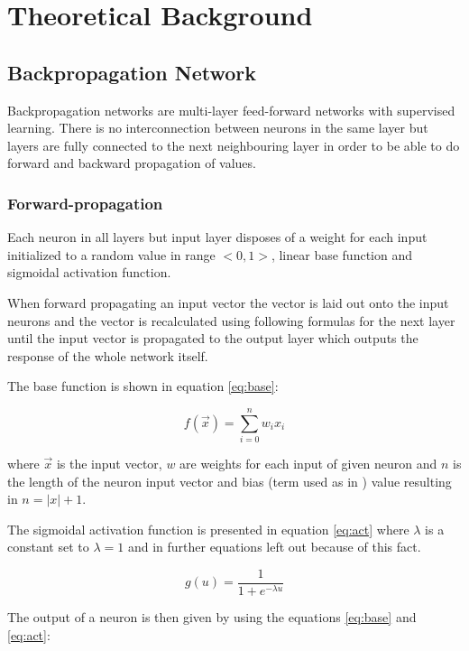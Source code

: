 \section{Theoretical Background}
\label{sec:theory}

\subsection{Backpropagation Network}
Backpropagation networks are multi-layer feed-forward networks with supervised learning. There is no interconnection between neurons in the same layer but layers are fully connected to the next neighbouring layer in order to be able to do forward and backward propagation of values.

\subsubsection{Forward-propagation}
Each neuron in all layers but input layer disposes of a weight for each input initialized to a random value in range $<0,1>$, linear base function and sigmoidal activation function.

When forward propagating an input vector the vector is laid out onto the input neurons and the vector is recalculated using following formulas for the next layer until the input vector is propagated to the output layer which outputs the response of the whole network itself.

The base function is shown in equation \ref{eq:base}:

\begin{equation}
    f(\vec{x}) =\sum_{i = 0}^{n} w_i x_i
    \label{eq:base}
\end{equation}

where $ \vec{x} $ is the input vector, $ w $ are weights for each input of given neuron and $ n $ is the length of the neuron input vector and bias (term used as in \cite{deeplearning}\cite{elements}) value resulting in $ n = |x| + 1$.

The sigmoidal activation function is presented in equation \ref{eq:act} where $ \lambda $ is a constant set to $ \lambda = 1 $ and in further equations left out because of this fact.

\begin{equation}
    g(u) = \frac{1}{1 + e^{-\lambda u}}
    \label{eq:act}
\end{equation}

The output of a neuron is then given by using the equations \ref{eq:base} and \ref{eq:act}:

